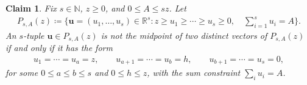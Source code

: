 \documentclass[10pt,a4paper]{article}
\newtheorem{claim}[definition]{Claim}
\newcommand{\R}{\mathbb R}
\newcommand{\N}{\mathbb N}
\begin{document}
    \begin{claim}\label{lem:capped-simplex}
        Fix $s\in\N$, $z\ge0$, and $0\le A\le sz$.  Let
        \begin{align*}
          P_{s,A}(z)\coloneqq\{\mathbf{u}=(u_1,\ldots,u_s)\in\R^s:
          z\ge u_1\ge\cdots\ge u_s\ge0,
          \quad \sum_{i=1}^s u_i=A\}.
        \end{align*}
        An $s$-tuple $\mathbf{u}\in P_{s,A}(z)$ is not the midpoint of two distinct
        vectors of $P_{s,A}(z)$ if and only if it has the form
        \begin{align}\label{eq:PsA-extreme-form}
          u_1=\cdots=u_a=z,
          \qquad
          u_{a+1}=\cdots=u_b=h,
          \qquad
          u_{b+1}=\cdots=u_s=0,
        \end{align}
        for some $0\le a\le b\le s$ and $0\le h\le z$, with the sum constraint
        $\sum_i u_i=A$.
    \end{claim}
    
\end{document}
